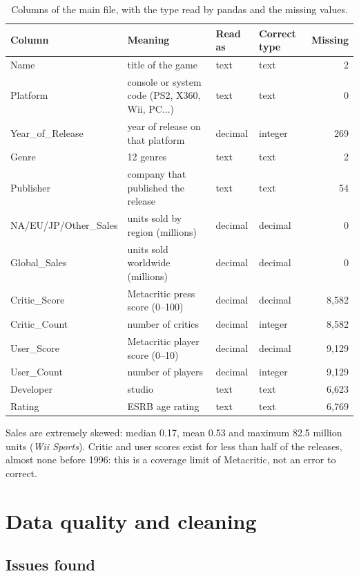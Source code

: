 \documentclass[12pt,a4paper]{article}
\begin{document}
\begin{table}[H]\centering\small
\caption{Columns of the main file, with the type read by pandas and the missing values.}
\begin{tabularx}{\linewidth}{@{}lXllr@{}}
\toprule
Column & Meaning & Read as & Correct type & Missing\\\midrule
Name & title of the game & text & text & 2\\
Platform & console or system code (PS2, X360, Wii, PC...) & text & text & 0\\
Year\_of\_Release & year of release on that platform & decimal & integer & 269\\
Genre & 12 genres & text & text & 2\\
Publisher & company that published the release & text & text & 54\\
NA/EU/JP/Other\_Sales & units sold by region (millions) & decimal & decimal & 0\\
Global\_Sales & units sold worldwide (millions) & decimal & decimal & 0\\
Critic\_Score & Metacritic press score (0--100) & decimal & decimal & 8{,}582\\
Critic\_Count & number of critics & decimal & integer & 8{,}582\\
User\_Score & Metacritic player score (0--10) & decimal & decimal & 9{,}129\\
User\_Count & number of players & decimal & integer & 9{,}129\\
Developer & studio & text & text & 6{,}623\\
Rating & ESRB age rating & text & text & 6{,}769\\
\bottomrule
\end{tabularx}
\end{table}

Sales are extremely skewed: median 0.17, mean 0.53 and maximum 82.5 million units
(\emph{Wii Sports}). Critic and user scores exist for less than half of the releases,
almost none before 1996: this is a coverage limit of Metacritic, not an error to correct.

\section{Data quality and cleaning}

\subsection{Issues found}
\end{document}
